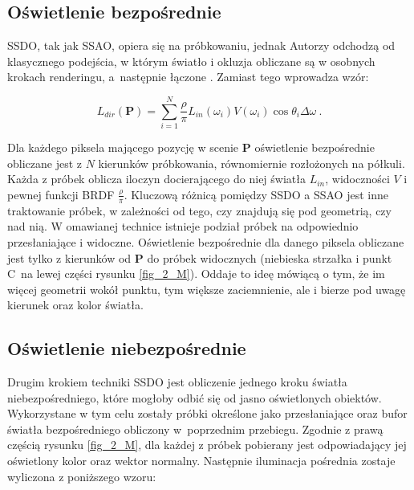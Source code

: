 		\subsection{Oświetlenie bezpośrednie}
		\label{t:teoria:ssdo:direct}
		
		SSDO, tak jak SSAO, opiera się na próbkowaniu, jednak Autorzy odchodzą od klasycznego podejścia, w którym światło i okluzja obliczane są w osobnych krokach renderingu, a~następnie łączone \cite{ssdo}. Zamiast tego wprowadza wzór:
		
		\begin{equation}
		L_{dir}(\mathbf{P}) = \sum_{i=1}^{N}\frac{\rho}{\pi}L_{in}(\omega_{i})V(\omega_{i})\cos\theta_{i}\Delta\omega\ .
		\end{equation}
		
		Dla każdego piksela mającego pozycję w scenie \(\mathbf{P}\) oświetlenie bezpośrednie obliczane jest z \(N\) kierunków próbkowania, równomiernie rozłożonych na półkuli. Każda z próbek oblicza iloczyn docierającego do niej światła \(L_{in}\), widoczności \(V\) i pewnej funkcji BRDF \(\frac{\rho}{\pi}\). Kluczową różnicą pomiędzy SSDO a SSAO jest inne traktowanie próbek, w zależności od tego, czy znajdują się pod geometrią, czy nad nią. W omawianej technice istnieje podział próbek na odpowiednio przesłaniające i widoczne. Oświetlenie bezpośrednie dla danego piksela obliczane jest tylko z kierunków od \(\mathbf{P}\) do próbek widocznych (niebieska strzałka i punkt C~na lewej części rysunku \ref{fig_2_M}). Oddaje to ideę mówiącą o tym, że im więcej geometrii wokół punktu, tym większe zaciemnienie, ale i bierze pod uwagę kierunek oraz kolor światła.
		
		
		\subsection{Oświetlenie niebezpośrednie}
		\label{t:teoria:ssdo:indirect}
		
		Drugim krokiem techniki SSDO jest obliczenie jednego kroku światła niebezpośredniego, które mogłoby odbić się od jasno oświetlonych obiektów. Wykorzystane w tym celu zostały próbki określone jako przesłaniające oraz bufor światła bezpośredniego obliczony w~poprzednim przebiegu. Zgodnie z prawą częścią rysunku \ref{fig_2_M}, dla każdej z próbek pobierany jest odpowiadający jej oświetlony kolor oraz wektor normalny. Następnie iluminacja pośrednia zostaje wyliczona z poniższego wzoru:
		 
